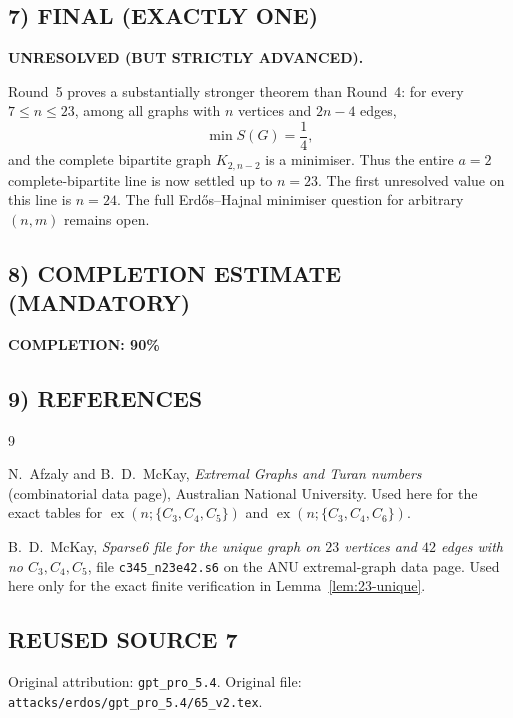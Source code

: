 \subsection*{7) FINAL (EXACTLY ONE)}

\textbf{UNRESOLVED (BUT STRICTLY ADVANCED).}

Round~5 proves a substantially stronger theorem than Round~4:
for every $7\le n\le 23$, among all graphs with $n$ vertices and $2n-4$ edges,
\[
\min S(G)=\frac14,
\]
and the complete bipartite graph $K_{2,n-2}$ is a minimiser.
Thus the entire $a=2$ complete-bipartite line is now settled up to $n=23$.
The first unresolved value on this line is $n=24$.
The full Erd\H{o}s--Hajnal minimiser question for arbitrary $(n,m)$ remains open.

\subsection*{8) COMPLETION ESTIMATE (MANDATORY)}

\textbf{COMPLETION: 90\%}

\subsection*{9) REFERENCES}

\begin{thebibliography}{9}

N.~Afzaly and B.~D.~McKay,
\emph{Extremal Graphs and Turan numbers} (combinatorial data page),
Australian National University.
Used here for the exact tables for
$\operatorname{ex}(n;\{C_3,C_4,C_5\})$ and
$\operatorname{ex}(n;\{C_3,C_4,C_6\})$.

B.~D.~McKay,
\emph{Sparse6 file for the unique graph on $23$ vertices and $42$ edges with no $C_3,C_4,C_5$},
file \texttt{c345\_n23e42.s6} on the ANU extremal-graph data page.
Used here only for the exact finite verification in Lemma~\ref{lem:23-unique}.

\end{thebibliography}


\subsection*{REUSED SOURCE 7}
Original attribution: \texttt{gpt\_pro\_5.4}.
Original file: \texttt{attacks/erdos/gpt\_pro\_5.4/65\_v2.tex}.

